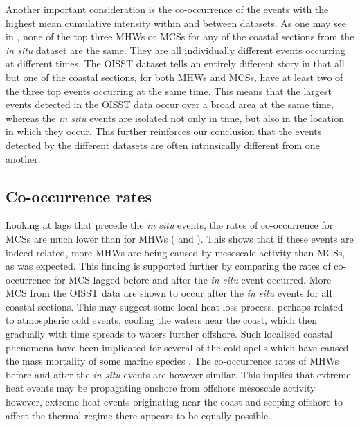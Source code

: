 \documentclass[a4paper,10pt,review]{elsarticle}
\begin{document}
Another important consideration is the co-occurrence of the events with the highest mean cumulative intensity within and between datasets. As one may see in , none of the top three MHWs or MCSs for any of the coastal sections from the \emph{in situ} dataset are the same. They are all individually different events occurring at different times. The OISST dataset tells an entirely different story in that all but one of the coastal sections, for both MHWs and MCSs, have at least two of the three top events occurring at the same time. This means that the largest events detected in the OISST data occur over a broad area at the same time, whereas the \emph{in situ} events are isolated not only in time, but also in the location in which they occur. This further reinforces our conclusion that the events detected by the different datasets are often intrinsically different from one another.

\subsection{Co-occurrence rates}
Looking at lags that precede the \emph{in situ} events, the rates of co-occurrence for MCSs are much lower than for MHWs ( and ). This shows that if these events are indeed related, more MHWs are being caused by mesoscale activity than MCSs, as was expected. This finding is supported further by comparing the rates of co-occurrence for MCS lagged before and after the \emph{in situ} event occurred. More MCS from the OISST data are shown to occur after the \emph{in situ} events for all coastal sections. This may suggest some local heat loss process, perhaps related to atmospheric cold events, cooling the waters near the coast, which then gradually with time spreads to waters further offshore. Such localised coastal phenomena have been implicated for several of the cold spells which have caused the mass mortality of some marine species \citep[e.g.][]{Gunter1941, Firth2011}. The co-occurrence rates of MHWs before and after the \emph{in situ} events are however similar. This implies that extreme heat events may be propagating onshore from offshore mesoscale activity however, extreme heat events originating near the coast and seeping offshore to affect the thermal regime there appears to be equally possible.
\end{document}
